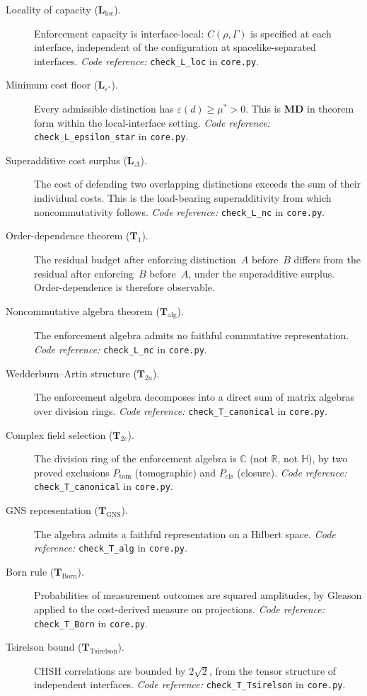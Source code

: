 \documentclass[11pt]{article}
\newcommand{\coderef}[2]{\smallskip\noindent\textit{Code reference:} \texttt{#1} in \texttt{#2}.}
\begin{document}
\begin{description}
    \item[Locality of capacity ($\mathbf{L}_{\mathrm{loc}}$).] Enforcement capacity is interface-local: $C(\rho, \Gamma)$ is specified at each interface, independent of the configuration at spacelike-separated interfaces. \coderef{check\_L\_loc}{core.py}
    \item[Minimum cost floor ($\mathbf{L}_{\varepsilon^*}$).] Every admissible distinction has $\varepsilon(d) \geq \mu^* > 0$. This is \textbf{MD} in theorem form within the local-interface setting. \coderef{check\_L\_epsilon\_star}{core.py}
    \item[Superadditive cost surplus ($\mathbf{L}_\Delta$).] The cost of defending two overlapping distinctions exceeds the sum of their individual costs. This is the load-bearing superadditivity from which noncommutativity follows. \coderef{check\_L\_nc}{core.py}
    \item[Order-dependence theorem ($\mathbf{T}_1$).] The residual budget after enforcing distinction~$A$ before~$B$ differs from the residual after enforcing~$B$ before~$A$, under the superadditive surplus. Order-dependence is therefore observable.
    \item[Noncommutative algebra theorem ($\mathbf{T}_{\mathrm{alg}}$).] The enforcement algebra admits no faithful commutative representation. \coderef{check\_L\_nc}{core.py}
    \item[Wedderburn--Artin structure ($\mathbf{T}_{2a}$).] The enforcement algebra decomposes into a direct sum of matrix algebras over division rings. \coderef{check\_T\_canonical}{core.py}
    \item[Complex field selection ($\mathbf{T}_{2c}$).] The division ring of the enforcement algebra is $\mathbb{C}$ (not $\mathbb{R}$, not $\mathbb{H}$), by two proved exclusions $P_{\mathrm{tom}}$ (tomographic) and $P_{\mathrm{cls}}$ (closure). \coderef{check\_T\_canonical}{core.py}
    \item[GNS representation ($\mathbf{T}_{\mathrm{GNS}}$).] The algebra admits a faithful representation on a Hilbert space. \coderef{check\_T\_alg}{core.py}
    \item[Born rule ($\mathbf{T}_{\mathrm{Born}}$).] Probabilities of measurement outcomes are squared amplitudes, by Gleason applied to the cost-derived measure on projections. \coderef{check\_T\_Born}{core.py}
    \item[Tsirelson bound ($\mathbf{T}_{\mathrm{Tsirelson}}$).] CHSH correlations are bounded by $2\sqrt{2}$, from the tensor structure of independent interfaces. \coderef{check\_T\_Tsirelson}{core.py}
\end{description}
\end{document}
